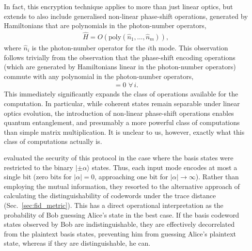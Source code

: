 \documentclass[aps, rmp, twocolumn, amsmath, amssymb, nofootinbib, superscriptaddress, longbibliography, floatfix, table-of-contents, eqsecnum]{revtex4-1}
\newcommand{\ket}[1]{|#1\rangle}
\begin{document}
In fact, this encryption technique applies to more than just linear optics, but extends to also include generalised non-linear phase-shift operations, generated by Hamiltonians that are polynomials in the photon-number operators,
\begin{align}
\hat{H} = O(\text{poly}(\hat{n}_1,\dots,\hat{n}_m)),
\end{align}
where $\hat{n}_i$ is the photon-number operator for the $i$th mode. This observation follows trivially from the observation that the phase-shift encoding operations (which are generated by Hamiltonians linear in the photon-number operators) commute with any polynomial in the photon-number operators,
\begin{align}
[\hat{n}_i,\text{poly}(\hat{n}_1,\dots,\hat{n}_m)] = 0\,\,\forall \, i.
\end{align}
This immediately significantly expands the class of operations available for the computation. In particular, while coherent states remain separable under linear optics evolution, the introduction of non-linear phase-shift operations enables quantum entanglement, and presumably a more powerful class of computations than simple matrix multiplication. It is unclear to us, however, exactly what this class of computations actually is.

\cite{siHuiTan} evaluated the security of this protocol in the case where the basis states were restricted to the binary $\ket{\pm\alpha}$ states. Thus, each input mode encodes at most a single bit (zero bits for \mbox{$|\alpha|=0$}, approaching one bit for \mbox{$|\alpha|\to\infty$}). Rather than employing the mutual information, they resorted to the alternative approach of calculating the distinguishability of codewords under the trace distance (Sec.~\ref{sec:fid_metric}). This has a direct operational interpretation as the probability of Bob guessing Alice's state in the best case. If the basis codeword states observed by Bob are indistinguishable, they are effectively decorrelated from the plaintext basis states, preventing him from guessing Alice's plaintext state, whereas if they are distinguishable, he can.
\end{document}
